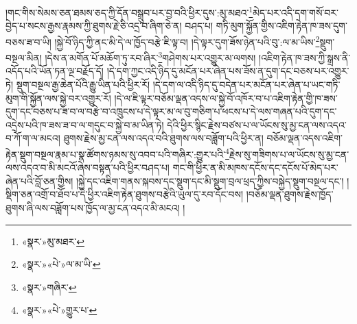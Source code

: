 །གང་གིས་སེམས་ཅན་ཐམས་ཅད་ཀྱི་དོན་བསྒྲུབ་པར་བྱ་བའི་ཕྱིར་དུས་:མུ་མཐའ་\footnote{«སྣར་»མུ་མཐར་}མེད་པར་འདི་དག་གསོ་བར་བྱེད་པ་སངས་རྒྱས་རྣམས་ཀྱི་ཐུགས་རྗེ་ཅི་འདྲ་བ་ཞིག་ཅེ་ན། བཤད་པ། གཏི་མུག་སྐྱོན་གྱིས་འཇིག་རྟེན་ཁ་ཟས་དུག་བཅས་ཟ་བ་ཡི། །སྐྱེ་བོ་ཉིད་ཀྱི་ནང་མི་དེ་ལ་ཁྱོད་བརྩེ་ཇི་ལྟ་བ། །དེ་ལྟར་དུག་ཟོས་ཉེན་པའི་བུ་:ལ་མ་ཡིས་\footnote{«སྣར་»«པེ་»ལ་མ་ཡི་}སྡུག་བསྔལ་མིན། །དེས་ན་མགོན་པོ་མཆོག་ཏུ་རབ་ཞིར་\footnote{«སྣར་»གཞིར་}གཤེགས་པར་འགྱུར་མ་ལགས། །འཇིག་རྟེན་ཁ་ཟས་ཀྱི་སྒྲས་ནི་འདོད་པའི་ཡོན་ཏན་ལྔ་བརྗོད་དོ། །དེ་དག་ཀྱང་འདི་ཉིད་དུ་མངོན་པར་ཞེན་པས་ཟོས་ན་དུག་དང་བཅས་པར་འགྱུར་ཏེ། སྡུག་བསྔལ་རྒྱ་ཆེན་པོའི་རྒྱུ་ཡིན་པའི་ཕྱིར་རོ། །དེ་དག་ལ་འདི་ཉིད་དུ་བདེན་པར་མངོན་པར་ཞེན་པ་ཡང་གཏི་མུག་གི་སྐྱོན་ལས་སྐྱེ་བར་འགྱུར་རོ། །དེ་ལ་ཇི་ལྟར་བཅོམ་ལྡན་འདས་ལ་སྐྱེ་བོ་འཁོར་བ་པ་འཇིག་རྟེན་གྱི་ཁ་ཟས་དུག་དང་བཅས་པ་ཟ་བ་ལ་བརྩེ་བ་འཁྲུངས་པ་དེ་ལྟར་མ་ལ་བུ་གཅིག་པ་ཕངས་པ་དེ་ལས་གཞན་པའི་དུག་དང་འདྲེས་པའི་ཁ་ཟས་ཟ་བ་ལ་གདུང་བ་སྐྱེ་བ་མ་ཡིན་ཏེ། དེའི་ཕྱིར་སྙིང་རྗེས་བཙས་པ་ལ་ཡོངས་སུ་མྱ་ངན་ལས་འདའ་བ་ཀོ་ག་ལ་མངའ། ཐུགས་རྗེས་མྱ་ངན་ལས་འདའ་བའི་ཐུགས་ལས་བཟློག་པའི་ཕྱིར་ན། བཅོམ་ལྡན་འདས་འཇིག་རྟེན་སྡུག་བསྔལ་རྣམ་པ་སྣ་ཚོགས་ཉམས་སུ་འབབ་པའི་གཞིར་:གྱུར་པའི་\footnote{«སྣར་»«པེ་»གྱུར་པ་}རྗེས་སུ་གཟིགས་པ་ལ་ཡོངས་སུ་མྱ་ངན་ལས་འདའ་བ་མི་མངའོ་ཞེས་བསྟན་པའི་ཕྱིར་བཤད་པ། གང་གི་ཕྱིར་ན་མི་མཁས་དངོས་དང་དངོས་པོ་མེད་པར་ཞེན་པའི་བློ་ཅན་གྱིས། །སྐྱེ་དང་འཇིག་གནས་སྐབས་དང་སྡུག་དང་མི་སྡུག་བྲལ་ཕྲད་ཀྱིས་བསྐྱེད་སྡུག་བསྔལ་དང་། །སྡིག་ཅན་འགྲོ་བ་ཐོབ་པ་དེ་ཕྱིར་འཇིག་རྟེན་ཐུགས་བརྩེའི་ཡུལ་དུ་རབ་དོང་བས། །བཅོམ་ལྡན་ཐུགས་རྗེས་ཁྱོད་ཐུགས་ཞི་ལས་བཟློག་པས་ཁྱོད་ལ་མྱ་ངན་འདའ་མི་མངའ། །
